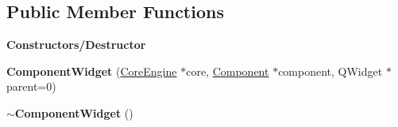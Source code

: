 \subsection*{Public Member Functions}
\begin{Indent}\textbf{ Constructors/\+Destructor}\par
\begin{DoxyCompactItemize}
\item 
\mbox{\label{classrev_1_1_view_1_1_component_widget_a3feeb51a8a9c254378bf12695ad18716}} 
{\bfseries Component\+Widget} (\mbox{\hyperlink{classrev_1_1_core_engine}{Core\+Engine}} $\ast$core, \mbox{\hyperlink{classrev_1_1_component}{Component}} $\ast$component, Q\+Widget $\ast$parent=0)
\item 
\mbox{\label{classrev_1_1_view_1_1_component_widget_a6336bf50dceb12a4d88dd38800496746}} 
{\bfseries $\sim$\+Component\+Widget} ()
\end{DoxyCompactItemize}
\end{Indent}
